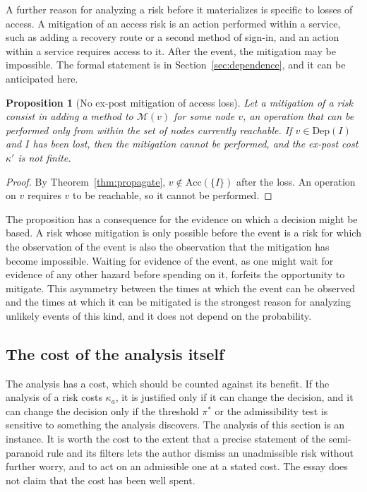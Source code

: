 \documentclass[11pt]{article}
\theoremstyle{plain}
\newtheorem{proposition}[theorem]{Proposition}
\theoremstyle{definition}
\theoremstyle{remark}
\begin{document}
A further reason for analyzing a risk before it materializes is specific to losses of access. A mitigation of an access risk is an action performed within a service, such as adding a recovery route or a second method of sign-in, and an action within a service requires access to it. After the event, the mitigation may be impossible. The formal statement is in Section~\ref{sec:dependence}, and it can be anticipated here.

\begin{proposition}[No ex-post mitigation of access loss]\label{prop:expost}
Let a mitigation of a risk consist in adding a method to $\mathcal M(v)$ for some node $v$, an operation that can be performed only from within the set of nodes currently reachable. If $v\in\mathrm{Dep}(I)$ and $I$ has been lost, then the mitigation cannot be performed, and the ex-post cost $\kappa'$ is not finite.
\end{proposition}

\begin{proof}
By Theorem~\ref{thm:propagate}, $v\notin\mathrm{Acc}(\{I\})$ after the loss. An operation on $v$ requires $v$ to be reachable, so it cannot be performed. \qedhere
\end{proof}

The proposition has a consequence for the evidence on which a decision might be based. A risk whose mitigation is only possible before the event is a risk for which the observation of the event is also the observation that the mitigation has become impossible. Waiting for evidence of the event, as one might wait for evidence of any other hazard before spending on it, forfeits the opportunity to mitigate. This asymmetry between the times at which the event can be observed and the times at which it can be mitigated is the strongest reason for analyzing unlikely events of this kind, and it does not depend on the probability.

\subsection{The cost of the analysis itself}

The analysis has a cost, which should be counted against its benefit. If the analysis of a risk costs $\kappa_a$, it is justified only if it can change the decision, and it can change the decision only if the threshold $\pi^{*}$ or the admissibility test is sensitive to something the analysis discovers. The analysis of this section is an instance. It is worth the cost to the extent that a precise statement of the semi-paranoid rule and its filters lets the author dismiss an unadmissible risk without further worry, and to act on an admissible one at a stated cost. The essay does not claim that the cost has been well spent.
\end{document}

